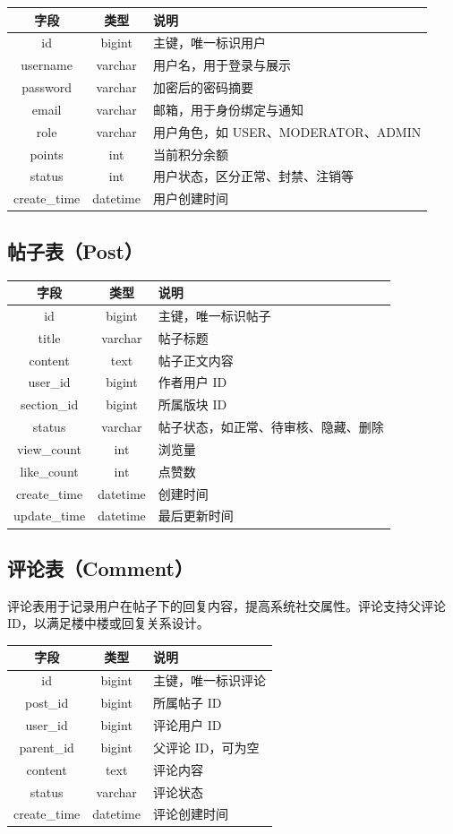 \documentclass[bwprint]{report}
\begin{document}
\begin{longtable}{|c|c|p{7cm}|}
\hline
字段 & 类型 & 说明 \\
\hline
id & bigint & 主键，唯一标识用户 \\
username & varchar & 用户名，用于登录与展示 \\
password & varchar & 加密后的密码摘要 \\
email & varchar & 邮箱，用于身份绑定与通知 \\
role & varchar & 用户角色，如 USER、MODERATOR、ADMIN \\
points & int & 当前积分余额 \\
status & int & 用户状态，区分正常、封禁、注销等 \\
create\_time & datetime & 用户创建时间 \\
\hline
\end{longtable}

\subsection{帖子表（Post）}

\begin{longtable}{|c|c|p{7cm}|}
\hline
字段 & 类型 & 说明 \\
\hline
id & bigint & 主键，唯一标识帖子 \\
title & varchar & 帖子标题 \\
content & text & 帖子正文内容 \\
user\_id & bigint & 作者用户 ID \\
section\_id & bigint & 所属版块 ID \\
status & varchar & 帖子状态，如正常、待审核、隐藏、删除 \\
view\_count & int & 浏览量 \\
like\_count & int & 点赞数 \\
create\_time & datetime & 创建时间 \\
update\_time & datetime & 最后更新时间 \\
\hline
\end{longtable}

\subsection{评论表（Comment）}

评论表用于记录用户在帖子下的回复内容，提高系统社交属性。评论支持父评论 ID，以满足楼中楼或回复关系设计。

\begin{longtable}{|c|c|p{7cm}|}
\hline
字段 & 类型 & 说明 \\
\hline
id & bigint & 主键，唯一标识评论 \\
post\_id & bigint & 所属帖子 ID \\
user\_id & bigint & 评论用户 ID \\
parent\_id & bigint & 父评论 ID，可为空 \\
content & text & 评论内容 \\
status & varchar & 评论状态 \\
create\_time & datetime & 评论创建时间 \\
\hline
\end{longtable}
\end{document}
